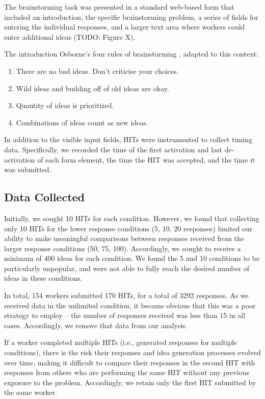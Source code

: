 The brainstorming task was presented in a standard web-based form that included an introduction, the specific brainstorming problem, a series of fields for entering the individual responses, and a larger text area where workers could enter additional ideas (TODO: Figure X).

The introduction Osborne's four rules of brainstorming \cite{osborn_applied_1957}, adapted to this context:

\begin{enumerate}
\item There are no bad ideas. Don't criticise your choices.
\item Wild ideas and building off of old ideas are okay.
\item Quantity of ideas is prioritized.
\item Combinations of ideas count as new ideas.
\end{enumerate}

In addition to the visible input fields, HITs were instrumented to collect timing data. Specifically, we recorded the time of the first activation and last de-activation of each form element, the time the HIT was accepted, and the time it was submitted.

\subsection{Data Collected}

Initially, we sought 10 HITs for each condition. However, we found that collecting only 10 HITs for the lower response conditions (5, 10, 20 responses) limited our ability to make meaningful comparisons between responses received from the larger response conditions (50, 75, 100). Accordingly, we sought to receive a minimum of 400 ideas for each condition. We found the 5 and 10 conditions to be particularly unpopular, and were not able to fully reach the desired number of ideas in these conditions.

In total, 154 workers submitted 170 HITs, for a total of 3292 responses. As we received data in the unlimited condition, it became obvious that this was a poor strategy to employ -- the number of responses received was less than 15 in all cases. Accordingly, we remove that data from our analysis.

If a worker completed multiple HITs (i.e., generated responses for multiple conditions), there is the risk their responses and idea generation processes evolved over time, making it difficult to compare their responses in the second HIT with responses from others who are performing the same HIT without any previous exposure to the problem. Accordingly, we retain only the first HIT submitted by the same worker.

